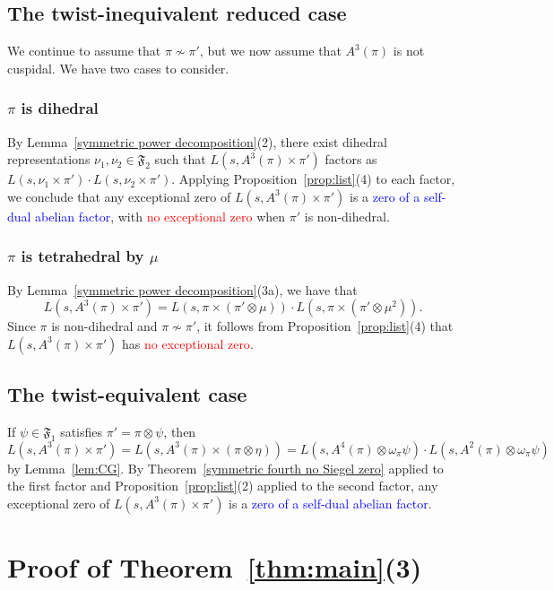 \documentclass[11pt]{amsart}
\theoremstyle{remark}
\numberwithin{equation}{section}
\begin{document}
\subsection{The twist-inequivalent reduced case}
We continue to assume that $\pi \not\sim \pi'$, but we now assume that $A^3(\pi)$ is not cuspidal. We have two cases to consider.
\subsubsection{$\pi$ is dihedral}
By Lemma~\ref{symmetric power decomposition}(2), there exist dihedral representations $\nu_1,\nu_2\in\mathfrak{F}_2$ such that $L(s,A^3(\pi) \times \pi')$ factors as $L(s,\nu_1\times\pi')\cdot L(s,\nu_2\times\pi')$.  Applying Proposition~\ref{prop:list}(4) to each factor, we conclude that any exceptional zero of $L(s,A^3(\pi) \times \pi')$ is a \textcolor{blue}{zero of a self-dual abelian factor}, with  \textcolor{red}{no exceptional zero} when $\pi'$ is non-dihedral.
\subsubsection{$\pi$ is tetrahedral by $\mu$}
By Lemma~\ref{symmetric power decomposition}(3a), we have that
\[
L(s,A^3(\pi) \times \pi') = L(s,\pi \times (\pi' \otimes \mu)) \cdot L(s,\pi \times (\pi' \otimes \mu^2)).
\]
Since $\pi$ is non-dihedral and $\pi\not\sim\pi'$, it follows from Proposition~\ref{prop:list}(4) that $L(s,A^3(\pi) \times \pi')$ has \textcolor{red}{no exceptional zero}.

\subsection{The twist-equivalent case}
If $\psi\in\mathfrak{F}_1$ satisfies $\pi' = \pi \otimes \psi$, then
\[
    L(s,A^3(\pi) \times \pi') = L(s,A^3(\pi) \times (\pi \otimes \eta)) = L(s,A^4(\pi) \otimes \omega_\pi\psi) \cdot L(s,A^2(\pi) \otimes \omega_\pi\psi)
\]
by Lemma~\ref{lem:CG}.  By Theorem~\ref{symmetric fourth no Siegel zero} applied to the first factor and Proposition~\ref{prop:list}(2) applied to the second factor, any exceptional zero of $L(s,A^3(\pi) \times \pi')$ is a \textcolor{blue}{zero of a self-dual abelian factor}.


\section{Proof of Theorem~\ref{thm:main}(3)}
\label{sec:3}
\end{document}
